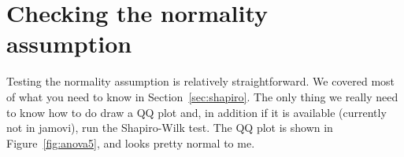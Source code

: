 \begin{comment}
\begin{rblock1}
> @usr{oneway.test(mood.gain ~ drug, data = clin.trial)}

	One-way analysis of means (not assuming equal variances)

data:  mood.gain and drug 
F = 26.322, num df = 2.000, denom df = 9.493, p-value = 0.000134
\end{rblock1}

\noindent
To understand what's happening here, let's compare these numbers to what we got earlier in Section~\ref{sec:introduceaov} when we ran our original ANOVA. To save you the trouble of flicking back, here are those numbers again, this time calculated by setting \rtext{var.equal = TRUE} for the \rtext{oneway.test()} function:
\begin{rblock1}
> @usr{oneway.test(mood.gain ~ drug, data = clin.trial, var.equal = TRUE)}

	One-way analysis of means

data:  mood.gain and drug 
F = 18.611, num df = 2, denom df = 15, p-value = 8.646e-05
\end{rblock1}
Okay, so originally our ANOVA gave us the result $F(2,15) = 18.6$, whereas the Welch one-way test gave us $F(2,9.49) = 26.32$. In other words, the Welch test has reduced the within-groups degrees of freedom from 15 to 9.49, and the $F$-value has increased from 18.6 to 26.32. 



\end{comment}




\section{Checking the normality assumption~\label{sec:anovanormality}}

Testing the normality assumption is relatively straightforward. We covered most of what you need to know in Section~\ref{sec:shapiro}. The only thing we really need to know how to do draw a QQ plot and, in addition if it is available (currently not in jamovi), run the Shapiro-Wilk test. The QQ plot is shown in Figure~\ref{fig:anova5}, and looks pretty normal to me.

\begin{comment} use once shapiro-wilk added to jamovi

> @usr{shapiro.test( x = my.anova.residuals )}   # run Shapiro-Wilk test

	Shapiro-Wilk normality test

data:  my.anova.residuals 
W = 0.9602, p-value = 0.6053
\end{rblock1}





\end{comment}



